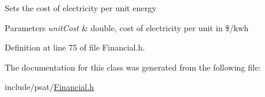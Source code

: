 Sets the cost of electricity per unit energy


\begin{DoxyParams}{Parameters}
{\em unit\+Cost} & double, cost of electricity per unit in \$/kwh \\
\hline
\end{DoxyParams}


Definition at line 75 of file Financial.\+h.



The documentation for this class was generated from the following file\+:\begin{DoxyCompactItemize}
\item 
include/psat/\hyperlink{_financial_8h}{Financial.\+h}\end{DoxyCompactItemize}

